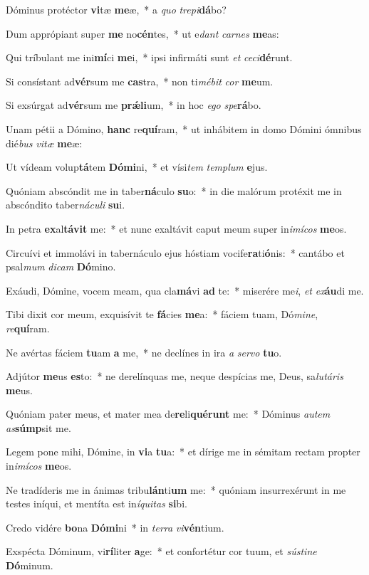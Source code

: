 \item Dóminus protéctor \textbf{vi}tæ \textbf{me}æ,~* a \textit{quo} \textit{tre}\textit{pi}\textbf{dá}bo?
\item Dum apprópiant super \textbf{me} no\textbf{cén}tes,~* ut e\textit{dant} \textit{car}\textit{nes} \textbf{me}as:
\item Qui tríbulant me ini\textbf{mí}ci \textbf{me}i,~* ipsi infirmáti sunt \textit{et} \textit{ce}\textit{ci}\textbf{dé}runt.
\item Si consístant ad\textbf{vér}sum me \textbf{cas}tra,~* non ti\textit{mé}\textit{bit} \textit{cor} \textbf{me}um.
\item Si exsúrgat ad\textbf{vér}sum me \textbf{prǽ}\textbf{li}um,~* in hoc \textit{e}\textit{go} \textit{spe}\textbf{rá}bo.
\item Unam pétii a Dómino, \textbf{hanc} re\textbf{quí}ram,~* ut inhábitem in domo Dómini ómnibus dié\textit{bus} \textit{vi}\textit{tæ} \textbf{me}æ:
\item Ut vídeam volup\textbf{tá}tem \textbf{Dó}\textbf{mi}ni,~* et vísi\textit{tem} \textit{tem}\textit{plum} \textbf{e}jus.
\item Quóniam abscóndit me in taber\textbf{ná}culo \textbf{su}o:~* in die malórum protéxit me in abscóndito taber\textit{ná}\textit{cu}\textit{li} \textbf{su}i.
\item In petra \textbf{ex}al\textbf{tá}\textbf{vit} me:~* et nunc exaltávit caput meum super in\textit{i}\textit{mí}\textit{cos} \textbf{me}os.
\item Circuívi et immolávi in tabernáculo ejus hóstiam vocife\textbf{ra}ti\textbf{ó}nis:~* cantábo et psal\textit{mum} \textit{di}\textit{cam} \textbf{Dó}mino.
\item Exáudi, Dómine, vocem meam, qua cla\textbf{má}vi \textbf{ad} te:~* miserére me\textit{i}, \textit{et} \textit{ex}\textbf{áu}di me.
\item Tibi dixit cor meum, exquisívit te \textbf{fá}cies \textbf{me}a:~* fáciem tuam, Dó\textit{mi}\textit{ne}, \textit{re}\textbf{quí}ram.
\item Ne avértas fáciem \textbf{tu}am \textbf{a} me,~* ne declínes in ira \textit{a} \textit{ser}\textit{vo} \textbf{tu}o.
\item Adjútor \textbf{me}us \textbf{es}to:~* ne derelínquas me, neque despícias me, Deus, sa\textit{lu}\textit{tá}\textit{ris} \textbf{me}us.
\item Quóniam pater meus, et mater mea de\textbf{re}li\textbf{qué}\textbf{runt} me:~* Dóminus \textit{au}\textit{tem} \textit{as}\textbf{súmp}sit me.
\item Legem pone mihi, Dómine, in \textbf{vi}a \textbf{tu}a:~* et dírige me in sémitam rectam propter in\textit{i}\textit{mí}\textit{cos} \textbf{me}os.
\item Ne tradíderis me in ánimas tribu\textbf{lán}ti\textbf{um} me:~* quóniam insurrexérunt in me testes iníqui, et mentíta est in\textit{í}\textit{qui}\textit{tas} \textbf{si}bi.
\item Credo vidére \textbf{bo}na \textbf{Dó}\textbf{mi}ni~* in \textit{ter}\textit{ra} \textit{vi}\textbf{vén}tium.
\item Exspécta Dóminum, vi\textbf{rí}liter \textbf{a}ge:~* et confortétur cor tuum, et \textit{sús}\textit{ti}\textit{ne} \textbf{Dó}minum.
